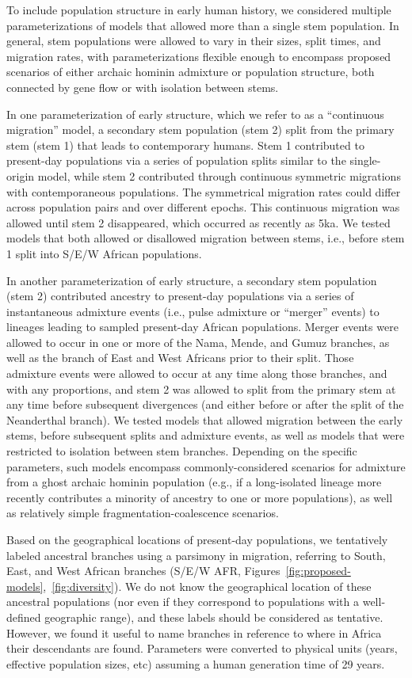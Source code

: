 \documentclass[]{article}
\begin{document}
To include population structure in early human history, we considered multiple
parameterizations of models that allowed more than a single stem population. In
general, stem populations were allowed to vary in their sizes, split times, and
migration rates, with parameterizations flexible enough to encompass proposed
scenarios of either archaic hominin admixture or population structure, both connected
by gene flow or with isolation between stems.

In one parameterization of early structure, which we refer to as a “continuous
migration” model, a secondary stem population (stem 2) split from the primary
stem (stem 1) that leads to contemporary humans. Stem 1 contributed to present-day
populations via a series of population splits similar to the single-origin
model, while stem 2 contributed through continuous symmetric migrations with
contemporaneous populations. The symmetrical migration rates could differ
across population pairs and over different epochs. This continuous migration
was allowed until stem 2 disappeared, which occurred as recently as 5ka. We
tested models that both allowed or disallowed migration between stems, i.e.,
before stem 1 split into S/E/W African populations.

In another parameterization of early structure, a secondary stem population
(stem 2) contributed ancestry to present-day populations via a series of
instantaneous admixture events (i.e., pulse admixture or “merger” events) to
lineages leading to sampled present-day African populations. Merger events were
allowed to occur in one or more of the Nama, Mende, and Gumuz branches, as well
as the branch of East and West Africans prior to their split. Those admixture
events were allowed to occur at any time along those branches, and with any
proportions, and stem 2 was allowed to split from the primary stem at any time
before subsequent divergences (and either before or after the split of the
Neanderthal branch). We tested models that allowed migration between the early
stems, before subsequent splits and admixture events, as well as models that
were restricted to isolation between stem branches. Depending on the specific
parameters, such models encompass commonly-considered scenarios for admixture from a ghost archaic hominin population (e.g., if a long-isolated lineage more recently contributes a
minority of ancestry to one or more populations), as well as relatively simple
fragmentation-coalescence scenarios.

Based on the geographical locations of present-day populations, we tentatively
labeled ancestral branches using a parsimony in migration, referring to South,
East, and West African branches
(S/E/W AFR, Figures~\ref{fig:proposed-models},~\ref{fig:diversity}). We do not know the
geographical location of these ancestral populations (nor even if they
correspond to populations with a well-defined geographic range), and these
labels should be considered as tentative. However, we found it useful to name
branches in reference to where in Africa their descendants are found.
Parameters were converted to physical units
(years, effective population sizes, etc)
assuming a human generation time of 29 years.
\end{document}
